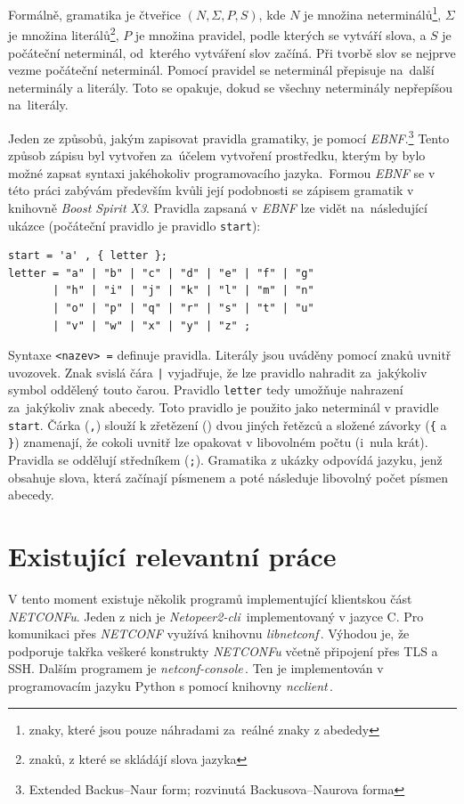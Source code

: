 \documentclass[thesis=B,czech,hidelinks]{FITthesis}[2019/03/06]
\begin{document}
Formálně, gramatika je čtveřice $(N, \Sigma, P, S)$, kde $N$ je množina neterminálů\footnote{znaky, které jsou pouze náhradami za~reálné znaky z abededy}, $\Sigma$ je množina literálů\footnote{znaků, z které se skládájí slova jazyka}, $P$ je množina pravidel, podle kterých se vytváří slova, a $S$ je počáteční neterminál, od~kterého vytváření slov začíná. Při tvorbě slov se nejprve vezme počáteční neterminál. Pomocí pravidel se neterminál přepisuje na~další neterminály a literály. Toto se opakuje, dokud se všechny neterminály nepřepíšou na~literály.

Jeden ze způsobů, jakým zapisovat pravidla gramatiky, je pomocí \textit{EBNF}.\footnote{Extended Backus--Naur form; rozvinutá Backusova--Naurova forma} Tento způsob zápisu byl vytvořen za~účelem vytvoření prostředku, kterým by bylo možné zapsat syntaxi jakéhokoliv programovacího jazyka.\,\cite{ebnf-cmu} Formou \textit{EBNF} se v této práci zabývám především kvůli její podobnosti se zápisem gramatik v knihovně \textit{Boost Spirit X3}. Pravidla zapsaná v \textit{EBNF} lze vidět na~následující ukázce (počáteční pravidlo je pravidlo \texttt{start}):

\clearpage
\begin{verbatim}
start = 'a' , { letter };
letter = "a" | "b" | "c" | "d" | "e" | "f" | "g"
       | "h" | "i" | "j" | "k" | "l" | "m" | "n"
       | "o" | "p" | "q" | "r" | "s" | "t" | "u"
       | "v" | "w" | "x" | "y" | "z" ;
\end{verbatim}
Syntaxe \verb¨<nazev> =¨ definuje pravidla. Literály jsou uváděny pomocí znaků uvnitř uvozovek. Znak svislá čára \texttt{|} vyjadřuje, že lze pravidlo nahradit za~jakýkoliv symbol oddělený touto čarou. Pravidlo \texttt{letter} tedy umožňuje nahrazení za~jakýkoliv znak abecedy. Toto pravidlo je použito jako neterminál v pravidle \texttt{start}. Čárka (\texttt{,}) slouží k zřetězení () dvou jiných řetězců a složené závorky (\texttt{\{} a \texttt{\}}) znamenají, že cokoli uvnitř lze opakovat v libovolném počtu (i~nula krát). Pravidla se oddělují středníkem (\texttt{;}). Gramatika z ukázky odpovídá jazyku, jenž obsahuje slova, která začínají písmenem  a poté následuje libovolný počet písmen abecedy.

\section{Existující relevantní práce}\label{existing}
V tento moment existuje několik programů implementující klientskou část \textit{NETCONFu}. Jeden z nich je \textit{Netopeer2-cli}\,\cite{netopeer} implementovaný v jazyce C. Pro komunikaci přes \textit{NETCONF} využívá knihovnu \textit{libnetconf}\,\cite{libnetconf}. Výhodou je, že podporuje takřka veškeré konstrukty \textit{NETCONFu} včetně připojení přes TLS a SSH\@. Dalším programem je \textit{netconf-console}\,\cite{netconf-console}. Ten je implementován v programovacím jazyku Python s pomocí knihovny \textit{ncclient}\,\cite{ncclient}.
\end{document}
